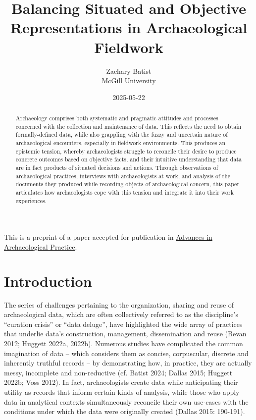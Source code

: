 \documentclass[
]{article}
\title{Balancing Situated and Objective Representations in
Archaeological Fieldwork}
\author{
      {Zachary
Batist \orcidlink{0000-0003-0435-508X} \href{mailto:zachary.batist@mcgill.ca}{\Letter}} \\
          McGill University
     \\
  }
\date{2025-05-22}
\begin{document}
\maketitle
\begin{abstract}
Archaeology comprises both systematic and pragmatic attitudes and
processes concerned with the collection and maintenance of data. This
reflects the need to obtain formally-defined data, while also grappling
with the fuzzy and uncertain nature of archaeological encounters,
especially in fieldwork environments. This produces an epistemic
tension, whereby archaeologists struggle to reconcile their desire to
produce concrete outcomes based on objective facts, and their intuitive
understanding that data are in fact products of situated decisions and
actions. Through observations of archaeological practices, interviews
with archaeologists at work, and analysis of the documents they produced
while recording objects of archaeological concern, this paper
articulates how archaeologists cope with this tension and integrate it
into their work experiences.
\end{abstract}


\begin{tcolorbox}[enhanced jigsaw, breakable, left=2mm, opacityback=0, bottomtitle=1mm, leftrule=.75mm, title=\textcolor{quarto-callout-note-color}{\faInfo}\hspace{0.5em}{Note}, opacitybacktitle=0.6, colbacktitle=quarto-callout-note-color!10!white, arc=.35mm, toptitle=1mm, bottomrule=.15mm, colframe=quarto-callout-note-color-frame, titlerule=0mm, toprule=.15mm, colback=white, coltitle=black, rightrule=.15mm]

This is a preprint of a paper accepted for publication in
\href{https://www.cambridge.org/core/journals/advances-in-archaeological-practice}{Advances
in Archaeological Practice}.

\end{tcolorbox}

\section{Introduction}\label{introduction}

The series of challenges pertaining to the organization, sharing and
reuse of archaeological data, which are often collectively referred to
as the discipline's ``curation crisis'' or ``data deluge'', have
highlighted the wide array of practices that underlie data's
construction, management, dissemination and reuse (Bevan 2012; Huggett
2022a, 2022b). Numerous studies have complicated the common imagination
of data -- which considers them as concise, corpuscular, discrete and
inherently truthful records -- by demonstrating how, in practice, they
are actually messy, incomplete and non-reductive (cf. Batist 2024;
Dallas 2015; Huggett 2022b; Voss 2012). In fact, archaeologists create
data while anticipating their utility as records that inform certain
kinds of analysis, while those who apply data in analytical contexts
simultaneously reconcile their own use-cases with the conditions under
which the data were originally created (Dallas 2015: 190-191).
\end{document}
